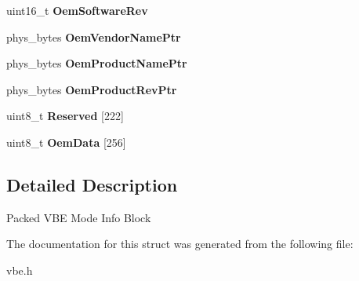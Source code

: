 \begin{DoxyCompactItemize}
\hypertarget{struct____attribute_____a133984a56ec19abf4fcb2e6ae71d6498}{}\label{struct____attribute_____a133984a56ec19abf4fcb2e6ae71d6498} 
uint16\+\_\+t {\bfseries Oem\+Software\+Rev}
\item 
\hypertarget{struct____attribute_____affd3a330afde841405f89bbcd05af4f0}{}\label{struct____attribute_____affd3a330afde841405f89bbcd05af4f0} 
phys\+\_\+bytes {\bfseries Oem\+Vendor\+Name\+Ptr}
\item 
\hypertarget{struct____attribute_____afd3d28c2078a683b1ed64ea21905fcfe}{}\label{struct____attribute_____afd3d28c2078a683b1ed64ea21905fcfe} 
phys\+\_\+bytes {\bfseries Oem\+Product\+Name\+Ptr}
\item 
\hypertarget{struct____attribute_____a239cba41d0489da5b79556b45797c6b0}{}\label{struct____attribute_____a239cba41d0489da5b79556b45797c6b0} 
phys\+\_\+bytes {\bfseries Oem\+Product\+Rev\+Ptr}
\item 
\hypertarget{struct____attribute_____a2c3b1cbb6bad5c51d4be4e57255a61d2}{}\label{struct____attribute_____a2c3b1cbb6bad5c51d4be4e57255a61d2} 
uint8\+\_\+t {\bfseries Reserved} \mbox{[}222\mbox{]}
\item 
\hypertarget{struct____attribute_____a966ae75c33c2d65b4f0c916f093acac0}{}\label{struct____attribute_____a966ae75c33c2d65b4f0c916f093acac0} 
uint8\+\_\+t {\bfseries Oem\+Data} \mbox{[}256\mbox{]}
\end{DoxyCompactItemize}


\subsection{Detailed Description}
Packed V\+BE Mode Info Block 

The documentation for this struct was generated from the following file\+:\begin{DoxyCompactItemize}
\item 
vbe.\+h\end{DoxyCompactItemize}
